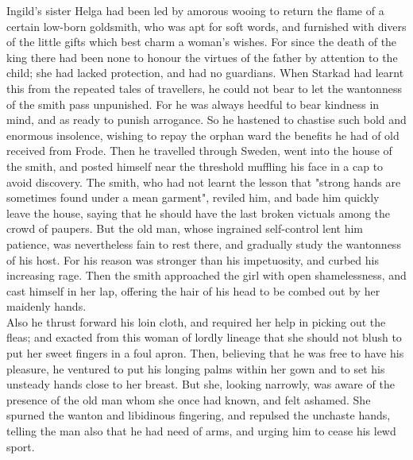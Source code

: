 \documentclass[10pt,a4paper]{report}
\begin{document}
Ingild's sister Helga had been led by amorous wooing to return the flame of a certain low-born goldsmith, who was apt for soft words, and furnished with divers of the little gifts which best charm a woman's wishes. For since the death of the king there had been none to honour the virtues of the father by attention to the child; she had lacked protection, and had no guardians. When Starkad had learnt this from the repeated tales of travellers, he could not bear to let the wantonness of the smith pass unpunished. For he was always heedful to bear kindness in mind, and as ready to punish arrogance. So he hastened to chastise such bold and enormous insolence, wishing to repay the orphan ward the benefits he had of old received from Frode. Then he travelled through Sweden, went into the house of the smith, and posted himself near the threshold muffling his face in a cap to avoid discovery. The smith, who had not learnt the lesson that "strong hands are sometimes found under a mean garment", reviled him, and bade him quickly leave the house, saying that he should have the last broken victuals among the crowd of paupers. But the old man, whose ingrained self-control lent him patience, was nevertheless fain to rest there, and gradually study the wantonness of his host. For his reason was stronger than his impetuosity, and curbed his increasing rage. Then the smith approached the girl with open shamelessness, and cast himself in her lap, offering the hair of his head to be combed out by her maidenly hands.\\

Also he thrust forward his loin cloth, and required her help in picking out the fleas; and exacted from this woman of lordly lineage that she should not blush to put her sweet fingers in a foul apron. Then, believing that he was free to have his pleasure, he ventured to put his longing palms within her gown and to set his unsteady hands close to her breast. But she, looking narrowly, was aware of the presence of the old man whom she once had known, and felt ashamed. She spurned the wanton and libidinous fingering, and repulsed the unchaste hands, telling the man also that he had need of arms, and urging him to cease his lewd sport.\\
\end{document}
